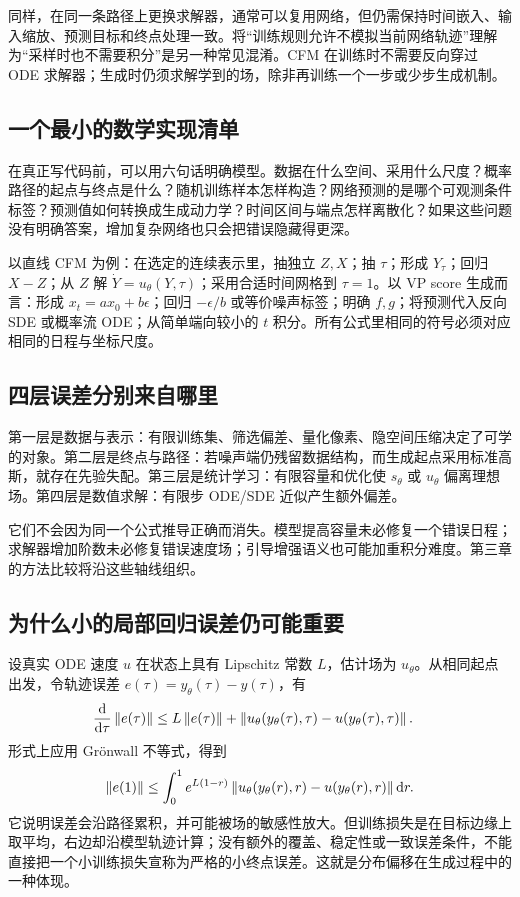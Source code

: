 同样，在同一条路径上更换求解器，通常可以复用网络，但仍需保持时间嵌入、输入缩放、预测目标和终点处理一致。将“训练规则允许不模拟当前网络轨迹”理解为“采样时也不需要积分”是另一种常见混淆。CFM 在训练时不需要反向穿过 ODE 求解器；生成时仍须求解学到的场，除非再训练一个一步或少步生成机制。

\subsection{一个最小的数学实现清单}
在真正写代码前，可以用六句话明确模型。数据在什么空间、采用什么尺度？概率路径的起点与终点是什么？随机训练样本怎样构造？网络预测的是哪个可观测条件标签？预测值如何转换成生成动力学？时间区间与端点怎样离散化？如果这些问题没有明确答案，增加复杂网络也只会把错误隐藏得更深。

以直线 CFM 为例：在选定的连续表示里，抽独立 $Z,X$；抽 $\tau$；形成 $Y_\tau$；回归 $X-Z$；从 $Z$ 解 $\dot Y=u_\theta(Y,\tau)$；采用合适时间网格到 $\tau=1$。以 VP score 生成而言：形成 $x_t=ax_0+b\epsilon$；回归 $-\epsilon/b$ 或等价噪声标签；明确 $f,g$；将预测代入反向 SDE 或概率流 ODE；从简单端向较小的 $t$ 积分。所有公式里相同的符号必须对应相同的日程与坐标尺度。

\subsection{四层误差分别来自哪里}
第一层是数据与表示：有限训练集、筛选偏差、量化像素、隐空间压缩决定了可学的对象。第二层是终点与路径：若噪声端仍残留数据结构，而生成起点采用标准高斯，就存在先验失配。第三层是统计学习：有限容量和优化使 $s_\theta$ 或 $u_\theta$ 偏离理想场。第四层是数值求解：有限步 ODE/SDE 近似产生额外偏差。

它们不会因为同一个公式推导正确而消失。模型提高容量未必修复一个错误日程；求解器增加阶数未必修复错误速度场；引导增强语义也可能加重积分难度。第三章的方法比较将沿这些轴线组织。

\subsection{为什么小的局部回归误差仍可能重要}
设真实 ODE 速度 $u$ 在状态上具有 Lipschitz 常数 $L$，估计场为 $u_\theta$。从相同起点出发，令轨迹误差 $e(\tau)=y_\theta(\tau)-y(\tau)$，有
\begin{align}
 \frac{\mathop{}\!\mathrm{d}}{\mathop{}\!\mathrm{d}\tau}\left\lVert e(\tau)\right\rVert
 &\le L\left\lVert e(\tau)\right\rVert+
 \left\lVert u_\theta(y_\theta(\tau),\tau)-u(y_\theta(\tau),\tau)\right\rVert.
\end{align}
形式上应用 Gr\"onwall 不等式，得到
\begin{equation}
 \left\lVert e(1)\right\rVert\le\int_0^1e^{L(1-r)}
 \left\lVert u_\theta(y_\theta(r),r)-u(y_\theta(r),r)\right\rVert\mathop{}\!\mathrm{d} r.
\end{equation}
它说明误差会沿路径累积，并可能被场的敏感性放大。但训练损失是在目标边缘上取平均，右边却沿模型轨迹计算；没有额外的覆盖、稳定性或一致误差条件，不能直接把一个小训练损失宣称为严格的小终点误差。这就是分布偏移在生成过程中的一种体现。

